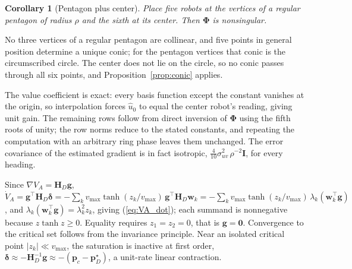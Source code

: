 \documentclass[lettersize,journal]{IEEEtran}
\newtheorem{corollary}{Corollary}
\begin{document}
\begin{corollary}[Pentagon plus center]
\label{cor:pentagon}
Place five robots at the vertices of a regular pentagon of radius $\rho$
and the sixth at its center. Then $\boldsymbol{\Phi}$ is nonsingular.
\end{corollary}

\begin{IEEEproof}
No three vertices of a regular pentagon are collinear, and five points in
general position determine a unique conic; for the pentagon vertices that
conic is the circumscribed circle. The center does not lie on the
circle, so no conic passes through all six points, and
Proposition~\ref{prop:conic} applies.
\end{IEEEproof}

\begin{IEEEproof}
The value coefficient is exact: every basis function except the constant
vanishes at the origin, so interpolation forces $\hat{u}_0$ to equal the
center robot's reading, giving unit gain. The remaining rows follow from
direct inversion of $\boldsymbol{\Phi}$ using the fifth roots of unity;
the row norms reduce to the stated constants, and repeating the
computation with an arbitrary ring phase leaves them unchanged. The
error covariance of the estimated gradient is in fact isotropic,
$\tfrac{4}{10}\sigma_{uv}^2\,\rho^{-2}\mathbf{I}$, for every heading.
\end{IEEEproof}

\begin{IEEEproof}
Since $\nabla V_A = \mathbf{H}_D \mathbf{g}$,
$\dot{V}_A = \mathbf{g}^\top \mathbf{H}_D \boldsymbol{\delta}
= -\sum_k v_{\max} \tanh(z_k/v_{\max})\,
\mathbf{g}^\top \mathbf{H}_D \mathbf{w}_k
= -\sum_k v_{\max} \tanh(z_k/v_{\max})\,\lambda_k
(\mathbf{w}_k^\top\mathbf{g})$, and $\lambda_k(\mathbf{w}_k^\top
\mathbf{g}) = \lambda_k^2 z_k$, giving (\ref{eq:VA_dot}); each summand
is nonnegative because $z\tanh z \geq 0$. Equality requires $z_1 = z_2 =
0$, that is $\mathbf{g} = \mathbf{0}$. Convergence to the critical set
follows from the invariance principle. Near an isolated critical point
$|z_k| \ll v_{\max}$, the saturation is inactive at first order,
$\boldsymbol{\delta} \approx -\mathbf{H}_D^{-1}\mathbf{g} \approx
-(\mathbf{p}_c - \mathbf{p}^\star_D)$, a unit-rate linear contraction.
\end{IEEEproof}
\end{document}
